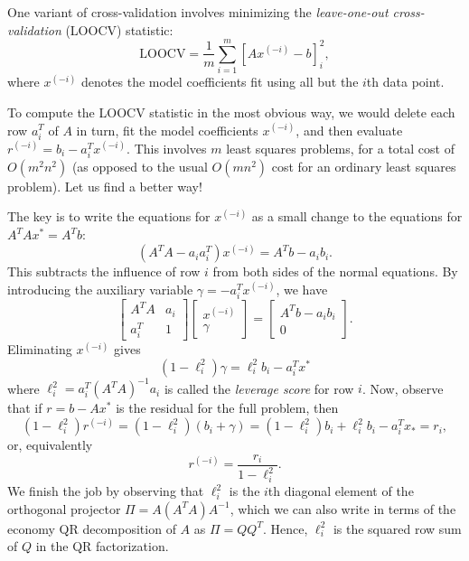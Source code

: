 \documentclass[12pt, leqno]{article} %
\begin{document}
One variant of cross-validation involves minimizing the
{\em leave-one-out cross-validation} (LOOCV) statistic:
\[
  \mbox{LOOCV} = \frac{1}{m} \sum_{i=1}^m \left[ Ax^{(-i)}-b \right]_i^2,
\]
where $x^{(-i)}$ denotes the model coefficients fit using all but the
$i$th data point.

To compute the LOOCV statistic in the most obvious way, we would
delete each row $a_i^T$ of $A$ in turn, fit the model coefficients
$x^{(-i)}$, and then evaluate $r^{(-i)} = b_i - a_i^T x^{(-i)}$.
This involves $m$
least squares problems, for a total cost of $O(m^2 n^2)$ (as opposed
to the usual $O(mn^2)$ cost for an ordinary least squares problem).
Let us find a better way!

The key is to write the equations for $x^{(-i)}$ as a small change to
the equations for $A^T A x^* = A^T b$:
\[
  (A^T A - a_i a_i^T) x^{(-i)} = A^T b - a_i b_i.
\]
This subtracts the influence of row $i$ from both sides of the normal
equations.  By introducing the auxiliary variable $\gamma = -a_i^T x^{(-i)}$,
we have
\[
  \begin{bmatrix}
    A^TA & a_i \\
    a_i^T & 1
  \end{bmatrix}
  \begin{bmatrix} x^{(-i)} \\ \gamma \end{bmatrix} =
  \begin{bmatrix} A^T b - a_i b_i \\ 0 \end{bmatrix}.
\]
Eliminating $x^{(-i)}$ gives
\[
  (1-\ell_i^2) \gamma = \ell_i^2 b_i - a_i^T x^*
\]
where $\ell_i^2 = a_i^T (A^T A)^{-1} a_i$ is called the
{\em leverage score} for row $i$.  Now, observe that
if $r = b-Ax^*$ is the residual for the full problem, then
\[
(1-\ell_i^2) r^{(-i)}
  = (1-\ell_i^2) (b_i + \gamma)
  = (1-\ell_i^2) b_i + \ell_i^2 b_i - a_i^T x_*
  = r_i,
\]
or, equivalently
\[
  r^{(-i)} = \frac{r_i}{1-\ell_i^2}.
\]
We finish the job by observing that $\ell_i^2$ is the $i$th diagonal
element of the orthogonal projector $\Pi = A(A^TA)A^{-1}$, which we
can also write in terms of the economy QR decomposition of $A$ as
$\Pi = QQ^T$.  Hence, $\ell_i^2$ is the squared row sum of $Q$ in
the QR factorization.
\end{document}

